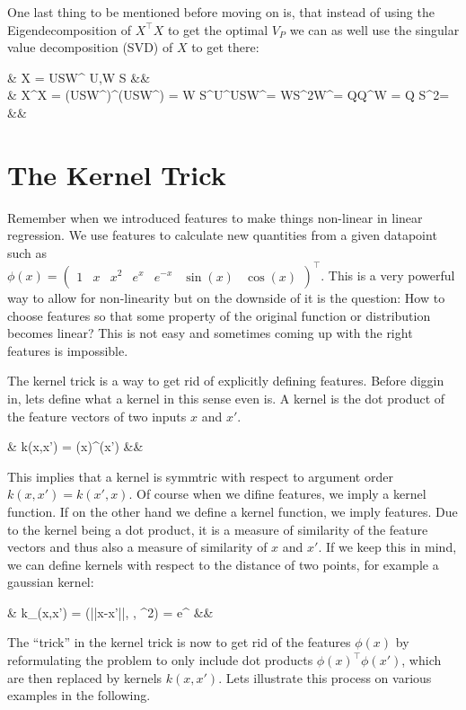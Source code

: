 \documentclass[12pt]{article}
\newcommand{\mat}[1]{\begin{pmatrix} #1 \end{pmatrix}}
\newcommand{\eqnsnn}[1]{\begin{flalign*} #1 \end{flalign*}}
\newcommand{\T}{^\top}
\newcommand{\mathtext}[1]{\quad\text{#1}\quad}
\begin{document}
One last thing to be mentioned before moving on is, that instead of using the Eigendecomposition of $X\T X$ to get the optimal $V_P$ we can as well use the singular value decomposition (SVD) of $X$ to get there:
\eqnsnn{&
X = USW\T \mathtext{with orthonormal} U,\;W \mathtext{and diagonal} S
&&\\&
X\T X = (USW\T)\T (USW\T) = W S\T U\T USW\T = WS^2W\T = Q\Lambda Q\T \implies W = Q \quad S^2=\Lambda
&&}


\section{The Kernel Trick}
Remember when we introduced features to make things non-linear in linear regression.
We use features to calculate new quantities from a given datapoint such as 
\\$\phi(x) = \mat{1 & x & x^2 & e^x & e^{-x} & \sin(x) & \cos(x)}\T$.
This is a very powerful way to allow for non-linearity but on the downside of it is the question:
How to choose features so that some property of the original function or distribution becomes linear?
This is not easy and sometimes coming up with the right features is impossible.

The kernel trick is a way to get rid of explicitly defining features.
Before diggin in, lets define what a kernel in this sense even is.
A kernel is the dot product of the feature vectors of two inputs $x$ and $x'$.
\eqnsnn{&
k(x,x') = \phi(x)\T\phi(x')
&&}
This implies that a kernel is symmtric with respect to argument order $k(x,x') = k(x',x)$.
Of course when we difine features, we imply a kernel function.
If on the other hand we define a kernel function, we imply features.
Due to the kernel being a dot product, it is a measure of similarity of the feature vectors and thus also a measure of similarity of $x$ and $x'$.
If we keep this in mind, we can define kernels with respect to the distance of two points, for example a gaussian kernel:
\eqnsnn{&
k_(x,x') = \mathcal{N}(||x-x'||, \mu, \sigma^2) = \frac1{\sqrt{2\pi\sigma^2}}e^{\frac{(||x-x'||-\mu)^2}{2\sigma^2}}
&&}

The \enquote{trick} in the kernel trick is now to get rid of the features $\phi(x)$ by reformulating the problem to only include dot products $\phi(x)\T\phi(x')$, which are then replaced by kernels $k(x,x')$.
Lets illustrate this process on various examples in the following.
\end{document}
